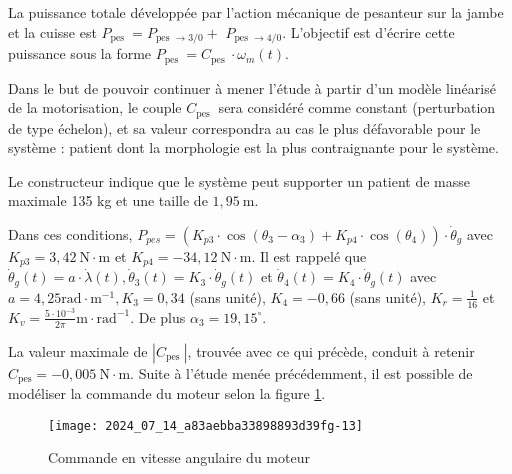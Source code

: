 La puissance totale développée par l'action mécanique de pesanteur sur la jambe et la cuisse est $P_{\text {pes }}=P_{\text {pes } \rightarrow 3 / 0}+$ $P_{\text {pes } \rightarrow 4 / 0}$. L'objectif est d'écrire cette puissance sous la forme $P_{\text {pes }}=C_{\text {pes }} \cdot \omega_{m}(t)$.

Dans le but de pouvoir continuer à mener l'étude à partir d'un modèle linéarisé de la motorisation, le couple $C_{\text {pes }}$ sera considéré comme constant (perturbation de type échelon), et sa valeur correspondra au cas le plus défavorable pour le système : patient dont la morphologie est la plus contraignante pour le système.

Le constructeur indique que le système peut supporter un patient de masse maximale 135 kg et une taille de $1,95 \mathrm{~m}$.

Dans ces conditions, $P_{p e s}=\left(K_{p 3} \cdot \cos \left(\theta_{3}-\alpha_{3}\right)+K_{p 4} \cdot \cos \left(\theta_{4}\right)\right) \cdot \dot{\theta}_{g}$ avec $K_{p 3}=3,42 \mathrm{~N} \cdot \mathrm{m}$ et $K_{p 4}=-34,12 \mathrm{~N} \cdot \mathrm{m}$. Il est rappelé que $\dot{\theta}_{g}(t)=a \cdot \dot{\lambda}(t), \dot{\theta}_{3}(t)=K_{3} \cdot \dot{\theta}_{g}(t)$ et $\dot{\theta}_{4}(t)=K_{4} \cdot \dot{\theta}_{g}(t)$ avec $a=4,25 \mathrm{rad} \cdot \mathrm{m}^{-1}, K_{3}=0,34$ (sans unité), $K_{4}=-0,66$ (sans unité), $K_{r}=\frac{1}{16}$ et $K_{v}=\frac{5 \cdot 10^{-3}}{2 \pi} \mathrm{m} \cdot \mathrm{rad}^{-1}$. De plus $\alpha_{3}=19,15^{\circ}$.



La valeur maximale de $\left|C_{\text {pes }}\right|$, trouvée avec ce qui précède, conduit à retenir $C_{\mathrm{pes}}=-0,005 \mathrm{~N} \cdot \mathrm{m}$. Suite à l'étude menée précédemment, il est possible de modéliser la commande du moteur selon la figure \ref{fig:ccs_mp_2024:fig:21}.

\begin{figure}[!h]\centering
\texttt{[image: 2024\_07\_14\_a83aebba33898893d39fg-13]}

\caption{\label{fig:ccs_mp_2024:fig:21}Commande en vitesse angulaire du moteur}
\end{figure}
